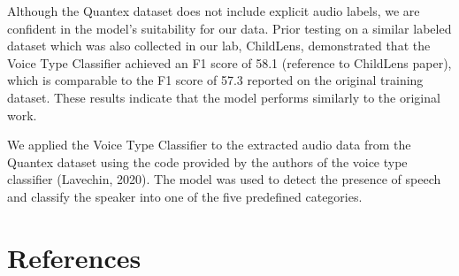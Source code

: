 \documentclass[
  man,floatsintext]{apa6}
\begin{document}
Although the Quantex dataset does not include explicit audio labels, we are confident in the model's suitability for our data. Prior testing on a similar labeled dataset which was also collected in our lab, ChildLens, demonstrated that the Voice Type Classifier achieved an F1 score of 58.1 (reference to ChildLens paper), which is comparable to the F1 score of 57.3 reported on the original training dataset. These results indicate that the model performs similarly to the original work.

We applied the Voice Type Classifier to the extracted audio data from the Quantex dataset using the code provided by the authors of the voice type classifier (Lavechin, 2020). The model was used to detect the presence of speech and classify the speaker into one of the five predefined categories.

\newpage

\section{References}\label{references-1}

\begingroup
\setlength{\parindent}{-0.5in}
\setlength{\leftskip}{0.5in}
\end{document}
